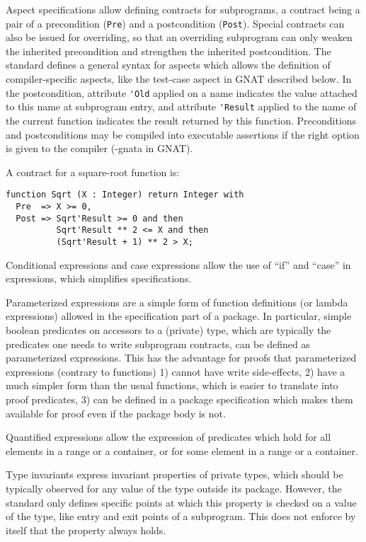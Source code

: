 \documentclass{article}
\newcounter{example}
\newenvironment{example}[1][EXAMPLE \theexample]{%
\par
\refstepcounter{example}%
\SpecialEnv{#1}{exampleborder}{examplebg}{}{\theexample}%
}{%
\endSpecialEnv
}
\begin{document}
Aspect specifications allow defining contracts for subprograms, a contract
being a pair of a precondition (\verb|Pre|) and a postcondition
(\verb|Post|). Special contracts can also be issued for overriding, so that an
overriding subprogram can only weaken the inherited precondition and strengthen
the inherited postcondition. The standard defines a general syntax for aspects
which allows the definition of compiler-specific aspects, like the test-case
aspect in GNAT described below. In the postcondition, attribute \verb|'Old|
applied on a name indicates the value attached to this name at subprogram
entry, and attribute \verb|'Result| applied to the name of the current function
indicates the result returned by this function. Preconditions and
postconditions may be compiled into executable assertions if the right option
is given to the compiler (-gnata in GNAT).

\begin{example}
A contract for a square-root function is:
\begin{verbatim}
function Sqrt (X : Integer) return Integer with
  Pre  => X >= 0,
  Post => Sqrt'Result >= 0 and then
          Sqrt'Result ** 2 <= X and then
          (Sqrt'Result + 1) ** 2 > X;
\end{verbatim}
\end{example}

Conditional expressions and case expressions allow the use of ``if'' and
``case'' in expressions, which simplifies specifications.

Parameterized expressions are a simple form of function definitions (or lambda
expressions) allowed in the specification part of a package. In particular,
simple boolean predicates on accessors to a (private) type, which are typically
the predicates one needs to write subprogram contracts, can be defined as
parameterized expressions. This has the advantage for proofs that parameterized
expressions (contrary to functions) 1) cannot have write side-effects, 2) have
a much simpler form than the usual functions, which is easier to translate into
proof predicates, 3) can be defined in a package specification which makes them
available for proof even if the package body is not.

Quantified expressions allow the expression of predicates which hold for all
elements in a range or a container, or for some element in a range or a
container.

Type invariants express invariant properties of private types, which should be
typically observed for any value of the type outside its package. However, the
standard only defines specific points at which this property is checked on a
value of the type, like entry and exit points of a subprogram. This does not
enforce by itself that the property always holds.
\end{document}
